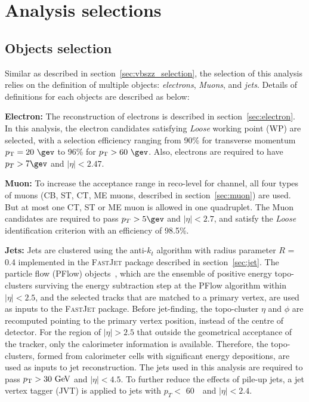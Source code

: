 \section{Analysis selections}
\label{sec:hmhzz_selection}

\subsection{Objects selection}
\label{sec:hmhzz_objsel}

Similar as described in section~\ref{sec:vbszz_selection}, the selection of this analysis relies on the definition of multiple objects: \textit{electrons}, \textit{Muons}, and \textit{jets}.
Details of definitions for each objects are described as below:

\textbf{Electron:}
The reconstruction of electrons is described in section~\ref{sec:electron}.
In this analysis, the electron candidates satisfying \textit{Loose} working point (WP) are selected,
with a selection efficiency ranging from 90\% for transverse momentum $\pt = 20~\gev$ to 96\% for $\pt > 60~\gev$.
Also, electrons are required to have $p_{T} > 7 \gev$ and $|\eta| < 2.47$.

\textbf{Muon:}
To increase the acceptance range in reco-level for \lllljj channel, all four types of muons
(CB, ST, CT, ME muons, described in section~\ref{sec:muon}) are used.
But at most one CT, ST or ME muon is allowed in one \llll quadruplet.
The Muon candidates are required to pass $p_{T} > 5 \gev$ and $|\eta| < 2.7$,
and satisfy the \textit{Loose} identification criterion with an efficiency of 98.5\%.

\textbf{Jets:}
Jets are clustered using the anti-$k_t$ algorithm with radius parameter $R$ = 0.4 implemented in the \textsc{FastJet} package described in section~\ref{sec:jet}. 
The particle flow (PFlow) objects~\cite{PERF-2015-09}, which are the ensemble of positive energy topo-clusters surviving the energy subtraction step at the PFlow algorithm within $|\eta| < 2.5$,
and the selected tracks that are matched to a primary vertex, are used as inputs to the \textsc{FastJet} package.
Before jet-finding, the topo-cluster $\eta$ and $\phi$ are recomputed pointing to the primary vertex position, instead of the centre of detector.
For the region of $|\eta| > 2.5$ that outside the geometrical acceptance of the tracker, only the calorimeter information is available.
Therefore, the topo-clusters, formed from calorimeter cells with significant energy depositions, are used as inputs to jet reconstruction.
The jets used in this analysis are required to pass $p_{\text{T}} > 30~\text{Ge\kern -0.1em V}$ and $|\eta |<4.5$.
To further reduce the effects of pile-up jets, a jet vertex tagger (JVT) is applied to jets with $p_{T} <$ 60~\gev~and $|\eta| < 2.4$.

